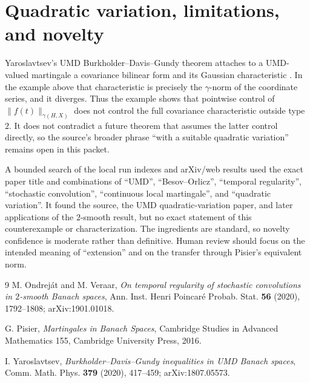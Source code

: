 \documentclass[11pt]{article}
\begin{document}
\section{Quadratic variation, limitations, and novelty}

Yaroslavtsev's UMD Burkholder--Davis--Gundy theorem attaches to a UMD-valued
martingale a covariance bilinear form and its Gaussian characteristic
\cite{Yaro}.  In the example above that characteristic is precisely the
$\gamma$-norm of the coordinate series, and it diverges.  Thus the example
shows that pointwise control of $\|f(t)\|_{\gamma(H,X)}$ does not control the
full covariance characteristic outside type $2$.  It does not contradict a
future theorem that assumes the latter control directly, so the source's
broader phrase ``with a suitable quadratic variation'' remains open in this
packet.

A bounded search of the local run indexes and arXiv/web results used the exact
paper title and combinations of ``UMD'', ``Besov--Orlicz'', ``temporal
regularity'', ``stochastic convolution'', ``continuous local martingale'',
and ``quadratic variation''.  It found the source, the UMD quadratic-variation
paper, and later applications of the $2$-smooth result, but no exact statement
of this counterexample or characterization.  The ingredients are standard,
so novelty confidence is moderate rather than definitive.  Human review
should focus on the intended meaning of ``extension'' and on the transfer
through Pisier's equivalent norm.

\begin{thebibliography}{9}
M. Ondrej\'at and M. Veraar,
\emph{On temporal regularity of stochastic convolutions in $2$-smooth Banach
spaces}, Ann. Inst. Henri Poincar\'e Probab. Stat. \textbf{56} (2020),
1792--1808; arXiv:1901.01018.

G. Pisier,
\emph{Martingales in Banach Spaces}, Cambridge Studies in Advanced
Mathematics 155, Cambridge University Press, 2016.

I. Yaroslavtsev,
\emph{Burkholder--Davis--Gundy inequalities in UMD Banach spaces},
Comm. Math. Phys. \textbf{379} (2020), 417--459; arXiv:1807.05573.
\end{thebibliography}
\end{document}

